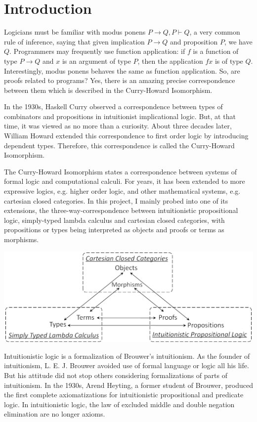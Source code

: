 \section{Introduction}
\label{sec:introduction}

Logicians must be familiar with modus ponens $ P\to Q,P\vdash Q $, a very common rule of inference, saying that given implication $ P\to Q $ and proposition $ P $, we have $ Q $. Programmers may frequently use function application: if $ f $ is a function of type $ P\to Q $ and $ x $ is an argument of type $ P $, then the application $ f x $ is of type $ Q $. Interestingly, modus ponens behaves the same as function application. So, are proofs related to programs? Yes, there is an amazing precise correspondence between them which is described in the Curry-Howard Isomorphism.

In the 1930s, Haskell Curry observed a correspondence between types of combinators and propositions in intuitionist implicational logic. But, at that time, it was viewed as no more than a curiosity. About three decades later, William Howard extended this correspondence to first order logic by introducing dependent types. Therefore, this correspondence is called the Curry-Howard Isomorphism.

The Curry-Howard Isomorphism states a correspondence between systems of formal logic and computational calculi. For years, it has been extended to more expressive logics, e.g. higher order logic, and other mathematical systems, e.g. cartesian closed categories. In this project, I mainly probed into one of its extensions, the three-way-correspondence between intuitionistic propositional logic, simply-typed lambda calculus and cartesian closed categories, with propositions or types being interpreted as objects and proofs or terms as morphisms.

\begin{center}
\includegraphics[width=\textwidth]{./images/triangle}
\end{center}

Intuitionistic logic is a formalization of Brouwer’s intuitionism. As the founder of intuitionism, L. E. J. Brouwer avoided use of formal language or logic all his life. But his attitude did not stop others considering formalizations of parts of intuitionism. In the 1930s, Arend Heyting, a former student of Brouwer, produced the first complete axiomatizations for intuitionistic propositional and predicate logic. In intuitionistic logic, the law of excluded middle and double negation elimination are no longer axioms.

